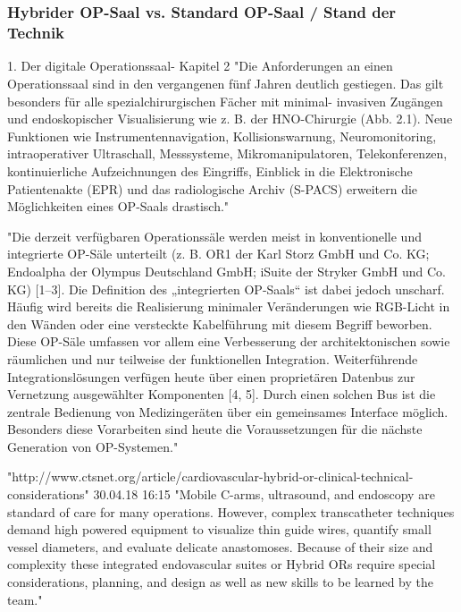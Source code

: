 \chapter{}
\label{sec:overview}

\subsection{Hybrider OP-Saal vs. Standard OP-Saal / Stand der Technik}
1. Der digitale Operationssaal- Kapitel 2
	"Die Anforderungen an einen Operationssaal sind in den vergangenen fünf Jahren
	deutlich gestiegen. Das gilt besonders für alle spezialchirurgischen Fächer mit minimal-
	invasiven Zugängen und endoskopischer Visualisierung wie z. B. der HNO-Chirurgie
	(Abb. 2.1). Neue Funktionen wie Instrumentennavigation, Kollisionswarnung,
	Neuromonitoring, intraoperativer Ultraschall, Messsysteme, Mikromanipulatoren,
	Telekonferenzen, kontinuierliche Aufzeichnungen des Eingriffs, Einblick in die Elektronische
	Patientenakte (EPR) und das radiologische Archiv (S-PACS) erweitern die
	Möglichkeiten eines OP-Saals drastisch."
	
	"Die derzeit verfügbaren Operationssäle werden meist in konventionelle und integrierte
	OP-Säle unterteilt (z. B. OR1 der Karl Storz GmbH und Co. KG; Endoalpha der
	Olympus Deutschland GmbH; iSuite der Stryker GmbH und Co. KG) [1–3]. Die Definition
	des „integrierten OP-Saals“ ist dabei jedoch unscharf. Häufig wird bereits die Realisierung
	minimaler Veränderungen wie RGB-Licht in den Wänden oder eine versteckte
	Kabelführung mit diesem Begriff beworben. Diese OP-Säle umfassen vor allem eine
	Verbesserung der architektonischen sowie räumlichen und nur teilweise der funktionellen
	Integration.
	Weiterführende Integrationslösungen verfügen heute über einen proprietären
	Datenbus zur Vernetzung ausgewählter Komponenten [4, 5]. Durch einen solchen
	Bus ist die zentrale Bedienung von Medizingeräten über ein gemeinsames Interface
	möglich. Besonders diese Vorarbeiten sind heute die Voraussetzungen für die nächste
	Generation von OP-Systemen."

"http://www.ctsnet.org/article/cardiovascular-hybrid-or-clinical-technical-considerations"	30.04.18 16:15
	"Mobile C-arms, ultrasound, and endoscopy are standard of care for many operations. However, complex transcatheter techniques demand high powered equipment to visualize thin guide wires, quantify small vessel diameters, and evaluate delicate anastomoses. Because of their size and complexity these integrated endovascular suites or Hybrid ORs require special considerations, planning, and design as well as new skills to be learned by the team."

